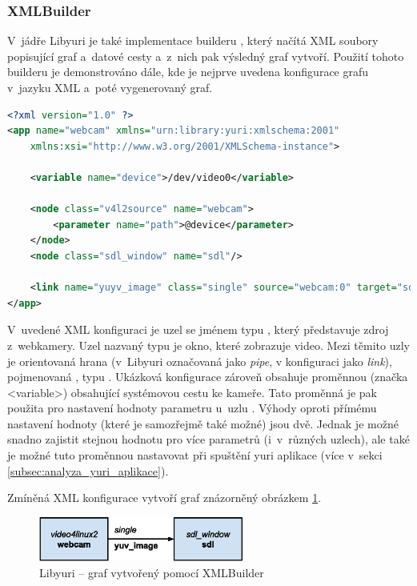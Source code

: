 \documentclass[thesis=M,czech]{FITthesis}[2012/06/26]
\begin{document}
\subsubsection{XMLBuilder} \label{subsec:analyza_yuri_vytvoreni_xml}
V~jádře Libyuri je také implementace builderu , který načítá XML soubory popisující graf a~datové cesty a~z~nich pak výsledný graf vytvoří. Použití tohoto builderu je demonstrováno dále, kde je nejprve uvedena konfigurace grafu v~jazyku XML a~poté vygenerovaný graf.
\\
\begin{minipage}{\linewidth}
\begin{lstlisting}[language=XML]
<?xml version="1.0" ?>
<app name="webcam" xmlns="urn:library:yuri:xmlschema:2001"
    xmlns:xsi="http://www.w3.org/2001/XMLSchema-instance">

    <variable name="device">/dev/video0</variable>    

    <node class="v4l2source" name="webcam">
        <parameter name="path">@device</parameter>
    </node>
    <node class="sdl_window" name="sdl"/>

    <link name="yuyv_image" class="single" source="webcam:0" target="sdl:0"/>
</app>
\end{lstlisting}
\end{minipage}
V~uvedené XML konfiguraci je uzel se jménem  typu , který představuje zdroj z~webkamery. Uzel nazvaný  typu  je okno, které zobrazuje video. Mezi těmito uzly je orientovaná hrana (v~Libyuri označovaná jako \textit{pipe}, v konfiguraci jako \textit{link}), pojmenovaná , typu . Ukázková konfigurace zároveň obsahuje proměnnou (značka <variable>) obsahující systémovou cestu ke kameře. Tato proměnná je pak použita pro nastavení hodnoty parametru  u~uzlu . Výhody oproti přímému nastavení hodnoty (které je samozřejmě také možné) jsou dvě. Jednak je možné snadno zajistit stejnou hodnotu pro více parametrů (i~v~různých uzlech), ale také je možné tuto proměnnou nastavovat při spuštění yuri aplikace (více v~sekci \ref{subsec:analyza_yuri_aplikace}). 

Zmíněná XML konfigurace vytvoří graf znázorněný obrázkem \ref{img:yuri_vytvoreni_xml}.
\\
\begin{figure}[h]\centering
	\includegraphics[width=0.6\textwidth]{images/yuri_xml_graph.eps}
	\caption{Libyuri -- graf vytvořený pomocí XMLBuilder}\label{img:yuri_vytvoreni_xml}
\end{figure}
\end{document}
